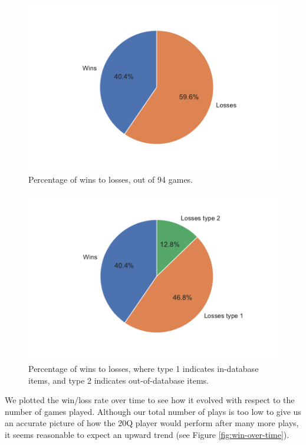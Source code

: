 \documentclass[11pt,a4paper]{article}
\begin{document}
\begin{figure}
    \centering
    \includegraphics[scale = .5]{graphics/pie-winsLosses.pdf}
    \caption{Percentage of wins to losses, out of 94 games.}
    \label{fig:wins-losses}
\end{figure}
\begin{figure}
    \centering
    \includegraphics[scale = .5]{graphics/pie_detailed-winsLosses.pdf}
    \caption{Percentage of wins to losses, where type 1 indicates in-database items, and type 2 indicates out-of-database items.}
    \label{fig:win-loss-type}
\end{figure}
We plotted the win/loss rate over time to see how it evolved with respect to the number of games played. Although our total number of plays is too low to give us an accurate picture of how the 20Q player would perform after many more plays, it seems reasonable to expect an upward trend (see Figure \ref{fig:win-over-time}).
\end{document}
